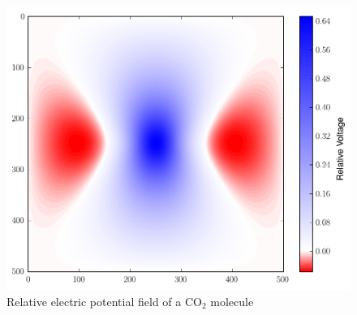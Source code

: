 \begin{figure}
\includegraphics[width=\textwidth]{co2V.pdf}
\caption{Relative electric potential field of a CO$_2$ molecule}
\end{figure}